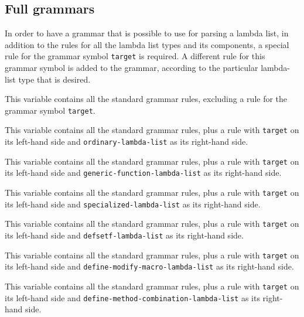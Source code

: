 \subsection{Full grammars}

In order to have a grammar that is possible to use for parsing a
lambda list, in addition to the rules for all the lambda list types
and its components, a special rule for the grammar symbol
\texttt{target} is required.  A different rule for this grammar symbol
is added to the grammar, according to the particular lambda-list type
that is desired.


This variable contains all the standard grammar rules, excluding a
rule for the grammar symbol \texttt{target}.


This variable contains all the standard grammar rules, plus a rule
with \texttt{target} on its left-hand side and
\texttt{ordinary-lambda-list} as its right-hand side.


This variable contains all the standard grammar rules, plus a rule
with \texttt{target} on its left-hand side and
\texttt{generic-function-lambda-list} as its right-hand side.


This variable contains all the standard grammar rules, plus a rule
with \texttt{target} on its left-hand side and
\texttt{specialized-lambda-list} as its right-hand side.


This variable contains all the standard grammar rules, plus a rule
with \texttt{target} on its left-hand side and
\texttt{defsetf-lambda-list} as its right-hand side.


This variable contains all the standard grammar rules, plus a rule
with \texttt{target} on its left-hand side and
\texttt{define-modify-macro-lambda-list} as its right-hand side.


This variable contains all the standard grammar rules, plus a rule
with \texttt{target} on its left-hand side and
\texttt{define-method-combination-lambda-list} as its right-hand side.

